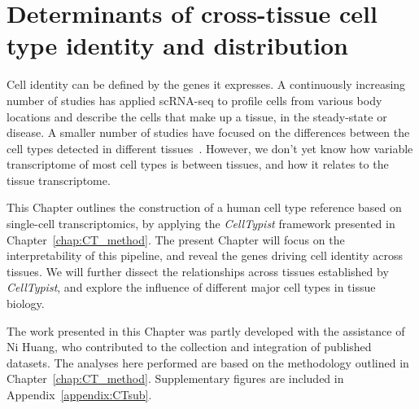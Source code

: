 \chapter{Determinants of cross-tissue cell type identity and distribution} \label{chap:CT_bio}

\ifpdf
    \graphicspath{{Chapter4/Figs/Raster/}{Chapter4/Figs/PDF/}{Chapter4/Figs/}}
\else
    \graphicspath{{Chapter4/Figs/Vector/}{Chapter4/Figs/}}
\fi
Cell identity can be defined by the genes it expresses. A continuously increasing number of studies has applied scRNA-seq to profile cells from various body locations and describe the cells that make up a tissue, in the steady-state or disease. A smaller number of studies have focused on the differences between the cell types detected in different tissues~\citep{miragaia_single-cell_2019,scott_transcription_2018}. However, we don't yet know how variable transcriptome of most cell types is between tissues, and how it relates to the tissue transcriptome.

This Chapter outlines the construction of a human cell type reference based on single-cell transcriptomics, by applying the \textit{CellTypist} framework presented in Chapter~\ref{chap:CT_method}. The present Chapter will focus on the interpretability of this pipeline, and reveal the genes driving cell identity across tissues. We will further dissect the relationships across tissues established by \textit{CellTypist}, and explore the influence of different major cell types in tissue biology.

The work presented in this Chapter was partly developed with the assistance of Ni Huang, who contributed to the collection and integration of published datasets. The analyses here performed are based on the methodology outlined in Chapter~\ref{chap:CT_method}. Supplementary figures are included in Appendix~\ref{appendix:CTsub}.


